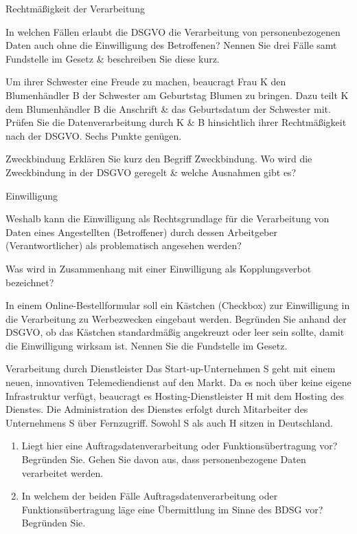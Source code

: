 \documentclass{exercisesheet}
\begin{document}
  \begin{exercise}{Rechtmäßigkeit der Verarbeitung}
      \item In welchen Fällen erlaubt die DSGVO die Verarbeitung von personenbezogenen Daten auch ohne die Einwilligung des Betroffenen? Nennen Sie drei Fälle samt Fundstelle im Gesetz \& beschreiben Sie diese kurz.
      \item Um ihrer Schwester eine Freude zu machen, beaucragt Frau K den Blumenhändler B der Schwester am Geburtstag Blumen zu bringen. Dazu teilt K dem Blumenhändler B die Anschrift \& das Geburtsdatum der Schwester mit. Prüfen Sie die Datenverarbeitung durch K \& B hinsichtlich ihrer Rechtmäßigkeit nach der DSGVO. Sechs Punkte genügen.
  \end{exercise}

  \begin{exercise*}{Zweckbindung}
    Erklären Sie kurz den Begriff Zweckbindung. Wo wird die Zweckbindung in der DSGVO geregelt \& welche Ausnahmen gibt es?
  \end{exercise*}

  \begin{exercise}{Einwilligung}
      \item Weshalb kann die Einwilligung als Rechtsgrundlage für die Verarbeitung von Daten eines Angestellten (Betroffener) durch dessen Arbeitgeber (Verantwortlicher) als problematisch angesehen werden?
      \item Was wird in Zusammenhang mit einer Einwilligung als Kopplungsverbot bezeichnet?
      \item In einem Online-Bestellformular soll ein Kästchen (Checkbox) zur Einwilligung in die Verarbeitung zu Werbezwecken eingebaut werden. Begründen Sie anhand der DSGVO, ob das Kästchen standardmäßig angekreuzt oder leer sein sollte, damit die Einwilligung wirksam ist. Nennen Sie die Fundstelle im Gesetz.
  \end{exercise}

  \begin{exercise*}{Verarbeitung durch Dienstleister}
    Das Start-up-Unternehmen S geht mit einem neuen, innovativen Telemediendienst auf den Markt. Da es noch über keine eigene Infrastruktur verfügt, beaucragt es Hosting-Dienstleister H mit dem Hosting des Dienstes. Die Administration des Dienstes erfolgt durch Mitarbeiter des Unternehmens S über Fernzugriff. Sowohl S als auch H sitzen in Deutschland.
    \begin{enumerate}
      \item Liegt hier eine Auftragsdatenverarbeitung oder Funktionsübertragung vor? Begründen Sie. Gehen Sie davon aus, dass personenbezogene Daten verarbeitet werden.
      \item In welchem der beiden Fälle Auftragsdatenverarbeitung oder Funktionsübertragung läge eine Übermittlung im Sinne des BDSG vor? Begründen Sie.
    \end{enumerate}
  \end{exercise*}
\end{document}
